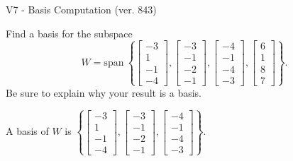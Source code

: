 \begin{exercise}
  \begin{exerciseTitle}V7 - Basis Computation (ver. 843)\end{exerciseTitle}
  \begin{exerciseStatement}
    Find a basis for the subspace 
\[W=\mathrm{span}\ \left\{\left[\begin{array}{r}
-3 \\
1 \\
-1 \\
-4
\end{array}\right] , \left[\begin{array}{r}
-3 \\
-1 \\
-2 \\
-1
\end{array}\right] , \left[\begin{array}{r}
-4 \\
-1 \\
-4 \\
-3
\end{array}\right] , \left[\begin{array}{r}
6 \\
1 \\
8 \\
7
\end{array}\right]\right\}.\]
 Be sure to explain why your result is a basis.


  \end{exerciseStatement}
  \begin{exerciseAnswer}
   A basis of \(W\) is  \(\left\{\left[\begin{array}{r}
-3 \\
1 \\
-1 \\
-4
\end{array}\right] , \left[\begin{array}{r}
-3 \\
-1 \\
-2 \\
-1
\end{array}\right] , \left[\begin{array}{r}
-4 \\
-1 \\
-4 \\
-3
\end{array}\right]\right\}\).
  


  \end{exerciseAnswer}
\end{exercise}